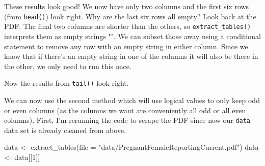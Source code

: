 \documentclass[
]{krantz}
\makeatletter
\newenvironment{Shaded}{\begin{snugshade}}{\end{snugshade}}
\newcommand{\AttributeTok}[1]{\textcolor[rgb]{0.61,0.61,0.61}{#1}}
\newcommand{\CommentTok}[1]{\textcolor[rgb]{0.37,0.37,0.37}{\textit{#1}}}
\newcommand{\DecValTok}[1]{\textcolor[rgb]{0.06,0.06,0.06}{#1}}
\newcommand{\FunctionTok}[1]{\textcolor[rgb]{0,0,0}{#1}}
\newcommand{\NormalTok}[1]{#1}
\newcommand{\OtherTok}[1]{\textcolor[rgb]{0.37,0.37,0.37}{#1}}
\newcommand{\SpecialCharTok}[1]{\textcolor[rgb]{0,0,0}{#1}}
\newcommand{\StringTok}[1]{\textcolor[rgb]{0.5,0.5,0.5}{#1}}
\newenvironment{kframe}{%
\medskip{}
\setlength{\fboxsep}{.8em}
 \def\at@end@of@kframe{}%
 \ifinner\ifhmode%
  \def\at@end@of@kframe{\end{minipage}}%
  \begin{minipage}{\columnwidth}%
 \fi\fi%
 \def\FrameCommand##1{\hskip\@totalleftmargin \hskip-\fboxsep
 \colorbox{shadecolor}{##1}\hskip-\fboxsep
     \hskip-\linewidth \hskip-\@totalleftmargin \hskip\columnwidth}%
 \MakeFramed {\advance\hsize-\width
   \@totalleftmargin\z@ \linewidth\hsize
   \@setminipage}}%
 {\par\unskip\endMakeFramed%
 \at@end@of@kframe}
\renewenvironment{Shaded}{\begin{kframe}}{\end{kframe}}
\makeatother
\begin{document}
These results look good! We now have only two columns and the first six rows (from \texttt{head()}) look right. Why are the last six rows all empty? Look back at the PDF. The final two columns are shorter than the others, so \texttt{extract\_tables()} interprets them as empty strings "". We can subset those away using a conditional statement to remove any row with an empty string in either column. Since we know that if there's an empty string in one of the columns it will also be there in the other, we only need to run this once.

\begin{Shaded}
\end{Shaded}

Now the results from \texttt{tail()} look right.

We can now use the second method which will use logical values to only keep odd or even columns (as the columns we want are conveniently all odd or all even columns). First, I'm rerunning the code to scrape the PDF since now our \texttt{data} data set is already cleaned from above.

\begin{Shaded}
\begin{Highlighting}[]
\NormalTok{data }\OtherTok{\textless{}{-}} \FunctionTok{extract\_tables}\NormalTok{(}\AttributeTok{file =} \StringTok{"data/PregnantFemaleReportingCurrent.pdf"}\NormalTok{)}
\NormalTok{data }\OtherTok{\textless{}{-}}\NormalTok{ data[[}\DecValTok{1}\NormalTok{]]}
\end{Highlighting}
\end{Shaded}
\end{document}
